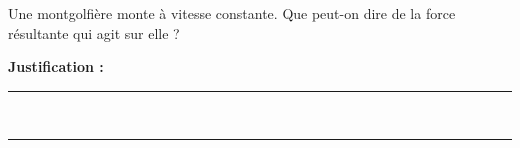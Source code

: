 Une montgolfière monte à vitesse constante. Que peut-on dire de la force résultante qui agit sur elle ?

\choices

\noindent\textbf{Justification :} \hrulefill \\[2.5ex]
\rule{\linewidth}{0.4pt} \\[2.5ex]
\rule{\linewidth}{0.4pt}
\vfill
